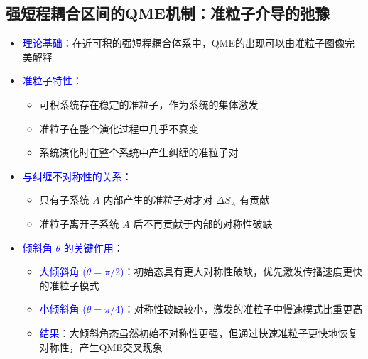 \documentclass[11pt,a4paper]{article}
\begin{document}
\subsection{强短程耦合区间的QME机制：准粒子介导的弛豫}
\begin{itemize}
    \item \textcolor{blue}{理论基础}：在近可积的强短程耦合体系中，QME的出现可以由准粒子图像完美解释
    
    \item \textcolor{blue}{准粒子特性}：
    \begin{itemize}
        \item 可积系统存在稳定的准粒子，作为系统的集体激发
        \item 准粒子在整个演化过程中几乎不衰变
        \item 系统演化时在整个系统中产生纠缠的准粒子对
    \end{itemize}
    
    \item \textcolor{blue}{与纠缠不对称性的关系}：
    \begin{itemize}
        \item 只有子系统 $A$ 内部产生的准粒子对才对 $\Delta S_A$ 有贡献
        \item 准粒子离开子系统 $A$ 后不再贡献于内部的对称性破缺
    \end{itemize}
    
    \item \textcolor{blue}{倾斜角 $\theta$ 的关键作用}：
    \begin{itemize}
        \item \textcolor{blue}{大倾斜角 ($\theta = \pi/2$)}：初始态具有更大对称性破缺，优先激发传播速度更快的准粒子模式
        \item \textcolor{blue}{小倾斜角 ($\theta = \pi/4$)}：对称性破缺较小，激发的准粒子中慢速模式比重更高
        \item \textcolor{blue}{结果}：大倾斜角态虽然初始不对称性更强，但通过快速准粒子更快地恢复对称性，产生QME交叉现象
    \end{itemize}
\end{itemize}
\end{document}
